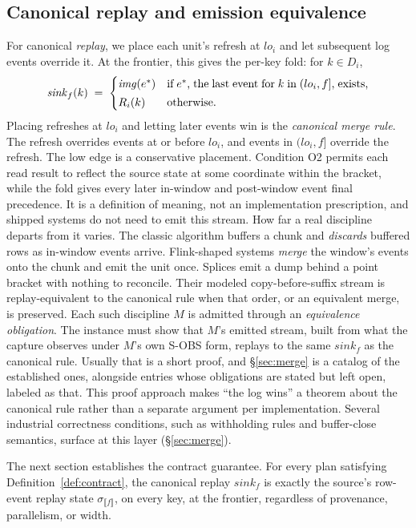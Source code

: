 \documentclass[sigconf,nonacm,10pt]{acmart}
\theoremstyle{plain}
\theoremstyle{definition}
\newcommand{\den}[1]{\llbracket #1 \rrbracket}   %
\newcommand{\window}[2]{(#1,#2]}                 %
\newcommand{\imgof}{\mathit{img}}                %
\newcommand{\sink}{\mathit{sink}}                %
\begin{document}
\subsection{Canonical replay and emission equivalence}\label{sec:contract-replay}

For canonical \emph{replay}, we place each unit's refresh at $lo_i$ and 
let subsequent log events override it. At the frontier, this gives 
the per-key fold: for $k \in D_i$,
\[
\sink_f(k) \;=\;
\begin{cases}
\imgof(e^{\ast}) & \parbox[t]{0.52\columnwidth}{if $e^{\ast}$, the
  last event for $k$ in $\window{lo_i}{f}$, exists,}\\[2pt]
R_i(k) & \text{otherwise.}
\end{cases}
\]
Placing refreshes at $lo_i$ and letting later events win is the
\emph{canonical merge rule}. The refresh overrides events at or 
before $lo_i$, and events in $(lo_i,f]$ override the refresh.
The low edge is a conservative placement.
Condition O2 permits each read result to reflect the source state at some coordinate within the bracket,
while the fold gives every later in-window and post-window
event final precedence. It is a definition of meaning, not an
implementation prescription, and shipped systems do not need to emit
this stream. How far a real discipline departs from it varies. The
classic algorithm buffers
a chunk and \emph{discards} buffered rows as in-window events
arrive. Flink-shaped systems \emph{merge} the window's events onto
the chunk and emit the unit once. Splices emit a dump behind a
point bracket with nothing to reconcile. Their modeled
copy-before-suffix stream is replay-equivalent to the canonical rule
when that order, or an equivalent merge, is preserved. Each such
discipline $M$ is admitted through an \emph{equivalence
obligation}. The instance must show that $M$'s emitted stream,
built from what the capture observes under $M$'s own S-OBS form,
replays to the same $\sink_f$ as the canonical rule. Usually that
is a short proof, and \S\ref{sec:merge} is a catalog of the
established ones, alongside entries whose obligations are stated but
left open, labeled as that. This proof approach makes ``the log wins'' a theorem about the canonical rule rather than a separate argument per implementation. Several industrial correctness conditions, such as withholding rules and buffer-close semantics, surface at this layer (\S\ref{sec:merge}).

The next section establishes the contract guarantee. For
every plan satisfying Definition~\ref{def:contract}, the canonical
replay $\sink_f$ is exactly the source's row-event replay state
$\sigma_{\den{f}}$, on every key, at the frontier, regardless of
provenance, parallelism, or width.
\end{document}
